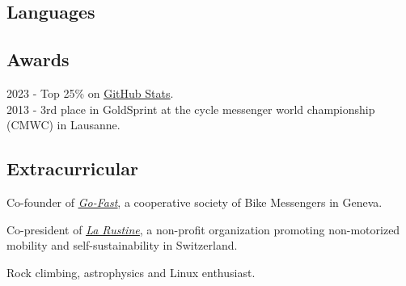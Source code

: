 \documentclass[]{plushcv}
\begin{document}
\begin{minipage}[t]{0.25\textwidth} 
\sectionsep
\sectionsep
\sectionsep
\sectionsep
\sectionsep
\sectionsep
\sectionsep
\sectionsep

\subsection{Languages}
\sectionsep
\runsubsection{}


\sectionsep
\runsubsection{}
\sectionsep
\sectionsep
\sectionsep



\subsection{Awards} 
\sectionsep
\sectionsep
\sectionsep

2023 - Top 25\% on \href{https://github-readme-stats-sigma-five.vercel.app/api?username=munoztd0&rank_icon=percentile&theme=radical}{\underline{GitHub Stats}}.\\
2013 - 3rd place in GoldSprint at the cycle messenger world championship (CMWC) in Lausanne.\\
\sectionsep
\sectionsep
\sectionsep


\subsection{Extracurricular} 
\sectionsep
\sectionsep
\sectionsep
\begin{tightemize}
\item Co-founder of \href{http://www.go-fast.ch/}{\underline{\textit{Go-Fast}}}, a cooperative society of Bike Messengers in Geneva.
\item Co-president of \href{http://www.larustine.bike/}{\underline{\textit{La Rustine}}}, a non-profit organization promoting non-motorized mobility and self-sustainability in Switzerland.
\item Rock climbing, astrophysics and Linux enthusiast.
\end{tightemize}


\end{minipage}
\end{document}
